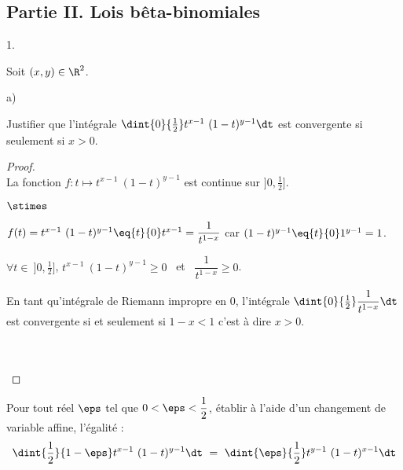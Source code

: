 \documentclass[11pt]{article}%
\begin{document}
\newpage


\subsection*{Partie II. Lois bêta-binomiales}

\begin{noliste}{1.}
  \setlength{\itemsep}{4mm} %
  \setcounter{enumi}{3}
\item Soit $(x,y) \in \R^2$.
  \begin{noliste}{a)}
    \setlength{\itemsep}{2mm}
  \item Justifier que l'intégrale $\dint{0}{\frac{1}{2}} t^{x-1} \
    (1-t)^{y-1} \dt$ est convergente si seulement si $x>0$.

    \begin{proof}~\\%
      La fonction $f : t \mapsto t^{x-1} \ (1-t)^{y-1}$ est continue
      sur $]0, \frac{1}{2}]$.
      \begin{noliste}{$\stimes$}
      \item $f(t) = t^{x-1} \ (1-t)^{y-1} \eq{t}{0} t^{x-1} =
        \dfrac{1}{t^{1-x}}$ \quad car \quad $(1-t)^{y-1} \eq{t}{0}
        1^{y-1} = 1$.
        
      \item $\forall t \in \ ]0, \frac{1}{2}]$, $t^{x-1} \ (1-t)^{y-1}
        \geq 0$ \ et \ $\dfrac{1}{t^{1-x}} \geq 0$.
        
      \item En tant qu'intégrale de Riemann impropre en $0$,
        l'intégrale $\dint{0}{\frac{1}{2}} \dfrac{1}{t^{1-x}} \dt$ est
        convergente si et seulement si $1 - x < 1$ c'est à dire $x >
        0$.
      \end{noliste}~\\[-1.4cm]
      ~\\[-1cm]
    \end{proof}
    
  \item Pour tout réel $\eps$ tel que $0 < \eps < \dfrac{1}{2}$,
    établir à l'aide d'un changement de variable affine, l'égalité :
    \[
    \dint{\frac{1}{2}}{1-\eps} t^{x-1} \ (1-t)^{y-1} \dt \ = \
    \dint{\eps}{\frac{1}{2}} t^{y-1} \ (1-t)^{x-1} \dt
    \]


\end{noliste}
\end{noliste}
\end{document}

